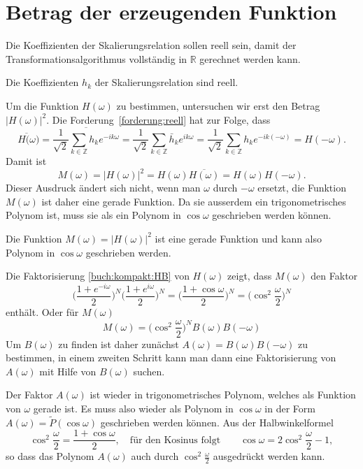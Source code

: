 %
%
%
\section{Betrag der erzeugenden Funktion\label{section:betrag}}
Die Koeffizienten der Skalierungsrelation sollen reell sein, damit
der Transformationsalgorithmus vollständig in $\mathbb R$ gerechnet
werden kann.

\begin{forderung}
\label{forderung:reell}
Die Koeffizienten $h_k$ der Skalierungsrelation sind reell.
\end{forderung}

Um die Funktion $H(\omega)$ zu bestimmen, untersuchen wir erst den
Betrag $|H(\omega)|^2$.
Die Forderung~\ref{forderung:reell} hat zur Folge, dass
\[
\overline{H(\omega})
=
\overline{
\frac1{\sqrt{2}}
\sum_{k\in\mathbb Z} h_ke^{-ik\omega}
}
=
\frac1{\sqrt{2}}
\sum_{k\in\mathbb Z} \bar{h}_ke^{ik\omega}
=
\frac1{\sqrt{2}}
\sum_{k\in\mathbb Z} h_ke^{-ik(-\omega)}
=
H(-\omega).
\]
Damit ist
\[
M(\omega)
=
|H(\omega)|^2
=
H(\omega)
\overline{H(\omega)}
=
H(\omega)H(-\omega).
\]
Dieser Ausdruck ändert sich nicht, wenn man $\omega$ durch $-\omega$
ersetzt, die Funktion $M(\omega)$ ist daher eine gerade Funktion.
Da sie ausserdem ein trigonometrisches Polynom ist, muss sie
als ein Polynom in $\cos\omega$ geschrieben werden können.

\begin{konsequenz}
Die Funktion $M(\omega)=|H(\omega)|^2$ ist eine gerade Funktion
und kann also Polynom in $\cos\omega$ geschrieben werden.
\end{konsequenz}

Die Faktorisierung \eqref{buch:kompakt:HB} von $H(\omega)$
zeigt, dass $M(\omega)$ den Faktor
\[
\biggl(\frac{1+e^{-i\omega}}2\biggr)^N
\biggl(\frac{1+e^{i\omega}}2\biggr)^N
=
\biggl( \frac{1+\cos\omega}2\biggr)^N
=
\biggl(
\cos^2\frac{\omega}2
\biggr)^N
\]
enthält.
Oder für $M(\omega)$
\begin{equation}
M(\omega)
= 
\biggl(
\cos^2\frac{\omega}2
\biggr)^N
B(\omega)B(-\omega)
\label{buch:kompakt:MB}
\end{equation}
Um $B(\omega)$ zu finden ist daher zunächst
$A(\omega)=B(\omega)B(-\omega)$
zu bestimmen, in einem zweiten Schritt kann man dann eine
Faktorisierung von $A(\omega)$ mit Hilfe von $B(\omega)$ suchen.

Der Faktor $A(\omega)$ ist wieder in trigonometrisches Polynom,
welches als Funktion von $\omega$ gerade ist.
Es muss also wieder als Polynom in $\cos\omega$
in der Form $A(\omega)=\tilde{P}(\cos\omega)$
geschrieben werden können.
Aus der Halbwinkelformel
\[
\cos^2\frac{\omega}2
=
\frac{1+\cos\omega}2,
\quad
\text{für den Kosinus folgt}
\qquad
\cos\omega
=
2\cos^2\frac{\omega}2 - 1,
\]
so dass das Polynom $A(\omega)$ auch durch $\cos^2\frac{\omega}2$
ausgedrückt werden kann.

